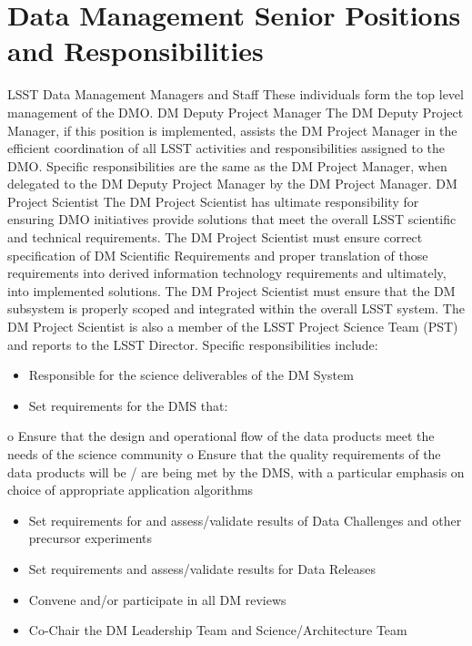 \section{Data Management Senior Positions and Responsibilities}
LSST Data Management Managers and Staff
These individuals form the top level management of the DMO.
DM Deputy Project Manager
The DM Deputy Project Manager, if this position is implemented, assists the DM Project Manager in the efficient coordination of all LSST activities and responsibilities assigned to the DMO.  Specific responsibilities are the same as the DM Project Manager, when delegated to the DM Deputy Project Manager by the DM Project Manager.
DM Project Scientist
The DM Project Scientist has ultimate responsibility for ensuring DMO initiatives provide solutions that meet the overall LSST scientific and technical requirements.  The DM Project Scientist must ensure correct specification of DM Scientific Requirements and proper translation of those requirements into derived information technology requirements and ultimately, into implemented solutions.  The DM Project Scientist must ensure that the DM subsystem is properly scoped and integrated within the overall LSST system.  The DM Project Scientist is also a member of the LSST Project Science Team (PST) and reports to the LSST Director. Specific responsibilities include:

\begin{itemize}
\item Responsible for the science deliverables of the DM System
\item Set requirements for the DMS that:
\end{itemize}
o Ensure that the design and operational flow of the data products meet the needs of the science community
o Ensure that the quality requirements of the data products will be / are being met by the DMS, with a particular emphasis on choice of appropriate application algorithms
\begin{itemize}
\item Set requirements for and assess/validate results of Data Challenges and other precursor experiments
\item Set requirements and assess/validate results for Data Releases
\item Convene and/or participate in all DM reviews
\item Co-Chair the DM Leadership Team and Science/Architecture Team
\end{itemize}


